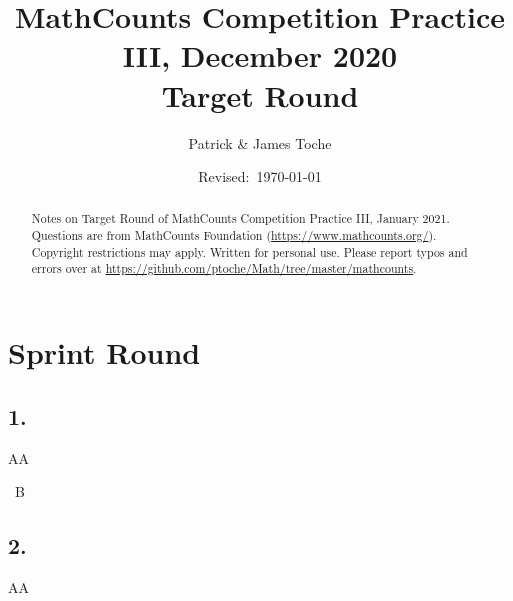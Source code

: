\documentclass[12pt]{article}
\title{MathCounts Competition Practice III, December 2020 \\ Target Round}
\author{Patrick \& James Toche}
\date{Revised:~\today}
\begin{document}
\maketitle
\begin{minipage}{\textwidth}
\begin{abstract}\setlength{\parindent}{0pt}%
Notes on Target Round of MathCounts Competition Practice III, January 2021. 
Questions are from MathCounts Foundation (\url{https://www.mathcounts.org/}). Copyright restrictions may apply. Written for personal use. 
Please report typos and errors over at \url{https://github.com/ptoche/Math/tree/master/mathcounts}. 
\end{abstract}
\end{minipage}

\thispagestyle{empty}
\clearpage
\addtocounter{page}{-1}

\section*{Sprint Round}


\subsection*{1.}
AA

\fbox{\phantom{ANSWER}}~B

\begin{answer}
%
\end{answer}


\subsection*{2.}
AA
\end{document}
